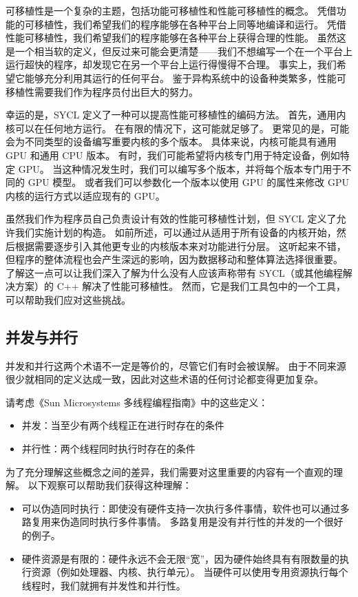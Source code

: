可移植性是一个复杂的主题，包括功能可移植性和性能可移植性的概念。 凭借功能的可移植性，我们希望我们的程序能够在各种平台上同等地编译和运行。 凭借性能可移植性，我们希望我们的程序能够在各种平台上获得合理的性能。 虽然这是一个相当软的定义，但反过来可能会更清楚——我们不想编写一个在一个平台上运行超快的程序，却发现它在另一个平台上运行得慢得不合理。 事实上，我们希望它能够充分利用其运行的任何平台。 鉴于异构系统中的设备种类繁多，性能可移植性需要我们作为程序员付出巨大的努力。

幸运的是，SYCL 定义了一种可以提高性能可移植性的编码方法。 首先，通用内核可以在任何地方运行。 在有限的情况下，这可能就足够了。 更常见的是，可能会为不同类型的设备编写重要内核的多个版本。 具体来说，内核可能具有通用 GPU 和通用 CPU 版本。 有时，我们可能希望将内核专门用于特定设备，例如特定 GPU。 当这种情况发生时，我们可以编写多个版本，并将每个版本专门用于不同的 GPU 模型。 或者我们可以参数化一个版本以使用 GPU 的属性来修改 GPU 内核的运行方式以适应现有的 GPU。

虽然我们作为程序员自己负责设计有效的性能可移植性计划，但 SYCL 定义了允许我们实施计划的构造。 如前所述，可以通过从适用于所有设备的内核开始，然后根据需要逐步引入其他更专业的内核版本来对功能进行分层。 这听起来不错，但程序的整体流程也会产生深远的影响，因为数据移动和整体算法选择很重要。 了解这一点可以让我们深入了解为什么没有人应该声称带有 SYCL（或其他编程解决方案）的 C++ 解决了性能可移植性。 然而，它是我们工具包中的一个工具，可以帮助我们应对这些挑战。


\subsection{并发与并行}
并发和并行这两个术语不一定是等价的，尽管它们有时会被误解。 由于不同来源很少就相同的定义达成一致，因此对这些术语的任何讨论都变得更加复杂。

请考虑《Sun Microsystems 多线程编程指南》中的这些定义：

\begin{itemize}
	\item 并发：当至少有两个线程正在进行时存在的条件

	\item 并行性：两个线程同时执行时存在的条件
\end{itemize}

为了充分理解这些概念之间的差异，我们需要对这里重要的内容有一个直观的理解。 以下观察可以帮助我们获得这种理解：

\begin{itemize}
	\item 可以伪造同时执行：即使没有硬件支持一次执行多件事情，软件也可以通过多路复用来伪造同时执行多件事情。 
		多路复用是没有并行性的并发的一个很好的例子。

	\item 硬件资源是有限的：硬件永远不会无限“宽”，因为硬件始终具有有限数量的执行资源（例如处理器、内核、执行单元）。 当硬件可以使用专用资源执行每个线程时，我们就拥有并发性和并行性。
\end{itemize}

